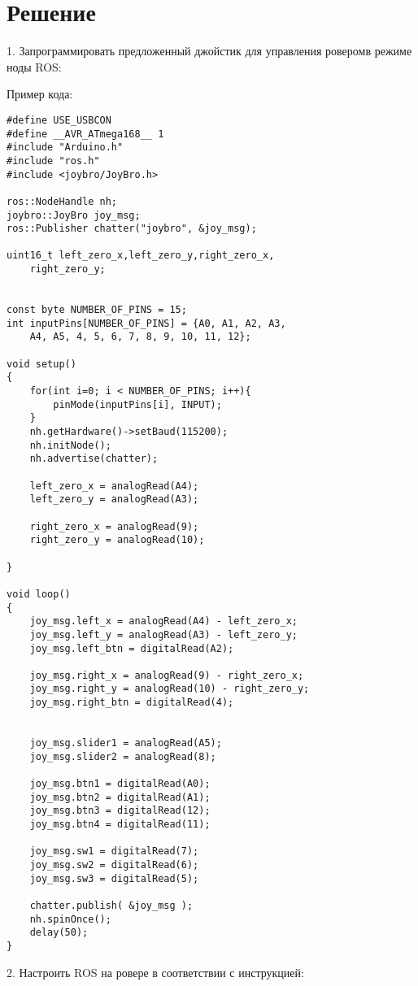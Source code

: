 \section{Решение}

1.  Запрограммировать предложенный джойстик для управления роверомв режиме ноды ROS:

Пример кода:

\begin{verbatim}
#define USE_USBCON
#define __AVR_ATmega168__ 1
#include "Arduino.h"
#include "ros.h" 
#include <joybro/JoyBro.h>

ros::NodeHandle nh;
joybro::JoyBro joy_msg;
ros::Publisher chatter("joybro", &joy_msg);

uint16_t left_zero_x,left_zero_y,right_zero_x,
    right_zero_y;


const byte NUMBER_OF_PINS = 15;
int inputPins[NUMBER_OF_PINS] = {A0, A1, A2, A3,
    A4, A5, 4, 5, 6, 7, 8, 9, 10, 11, 12};

void setup()
{
    for(int i=0; i < NUMBER_OF_PINS; i++){
        pinMode(inputPins[i], INPUT);
    }
    nh.getHardware()->setBaud(115200);
    nh.initNode();
    nh.advertise(chatter);
    
    left_zero_x = analogRead(A4);
    left_zero_y = analogRead(A3);

    right_zero_x = analogRead(9);
    right_zero_y = analogRead(10);
    
}

void loop()
{
    joy_msg.left_x = analogRead(A4) - left_zero_x;
    joy_msg.left_y = analogRead(A3) - left_zero_y;
    joy_msg.left_btn = digitalRead(A2);
    
    joy_msg.right_x = analogRead(9) - right_zero_x;
    joy_msg.right_y = analogRead(10) - right_zero_y;
    joy_msg.right_btn = digitalRead(4);


    joy_msg.slider1 = analogRead(A5);
    joy_msg.slider2 = analogRead(8);
    
    joy_msg.btn1 = digitalRead(A0);
    joy_msg.btn2 = digitalRead(A1);
    joy_msg.btn3 = digitalRead(12);
    joy_msg.btn4 = digitalRead(11);
    
    joy_msg.sw1 = digitalRead(7);
    joy_msg.sw2 = digitalRead(6);
    joy_msg.sw3 = digitalRead(5);
    
    chatter.publish( &joy_msg );
    nh.spinOnce();
    delay(50);
}
\end{verbatim}

2.  Настроить ROS на ровере в соответствии с инструкцией:

